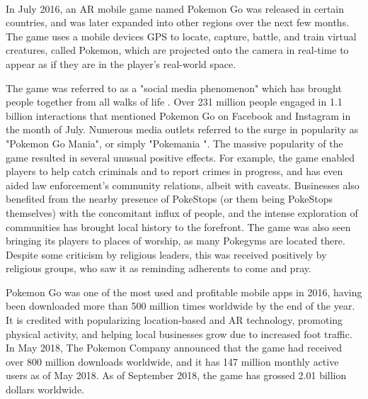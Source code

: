\paragraph{}
In July 2016, an AR mobile game named Pokemon Go was released in certain countries, and was later expanded into other regions over the next few months. The game uses a mobile devices GPS to locate, capture, battle, and train virtual creatures, called Pokemon, which are projected onto the camera in real-time to appear as if they are in the player's real-world space. 
\par
The game was referred to as a "social media phenomenon" which has brought people together from all walks of life\cite{duffy_2016} \cite{kain_2016}. Over 231 million people engaged in 1.1 billion interactions that mentioned Pokemon Go on Facebook and Instagram in the month of July\cite{laurenjohnson_2016}. Numerous media outlets referred to the surge in popularity as "Pokemon Go Mania", or simply "Pokemania\cite{isaac_2016} \cite{steinmetz_2016}". The massive popularity of the game resulted in several unusual positive effects. For example, the game enabled players to help catch criminals and to report crimes in progress,\cite{daye_2016} \cite{reports_2016} \cite{staff} and has even aided law enforcement's community relations,\cite{cherelus_2016} albeit with caveats\cite{rocha_2016}. Businesses also benefited from the nearby presence of PokeStops (or them being PokeStops themselves) with the concomitant influx of people,\cite{shields_perlberg_2016}\cite{sydneyShaw_2016} and the intense exploration of communities has brought local history to the forefront\cite{butcher_2016}. The game was also seen bringing its players to places of worship, as many Pokegyms are located there\cite{ahmed_2016}. Despite some criticism by religious leaders, this was received positively by religious groups, who saw it as reminding adherents to come and pray\cite{r_2016}.
\par
Pokemon Go was one of the most used and profitable mobile apps in 2016, having been downloaded more than 500 million times worldwide by the end of the year. It is credited with popularizing location-based and AR technology, promoting physical activity, and helping local businesses grow due to increased foot traffic. In May 2018, The Pokemon Company announced that the game had received over 800 million downloads worldwide, and it has 147 million monthly active users as of May 2018. As of September 2018, the game has grossed 2.01 billion dollars worldwide.

